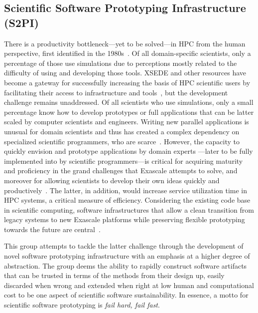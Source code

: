 \subsection{Scientific Software Prototyping Infrastructure (S2PI)}
\label{sec:prototyping}

There is a productivity bottleneck---yet to be solved---in HPC from the human
perspective, first identified in the 1980s~\cite{barstow1982automatic}. Of all
domain-specific scientists, only a percentage of those use simulations due to
perceptions mostly related to the difficulty of using and developing those tools.
XSEDE and other resources have become a gateway for successfully increasing the
basis of HPC scientific users by facilitating their access to infrastructure and
tools~\cite{towns2014xsede}, but the development challenge remains unaddressed.
Of all scientists who use simulations, only a small percentage know how
to develop prototypes or full applications that can be latter scaled by computer
scientists and engineers. Writing new parallel applications is unusual for
domain scientists and thus has created a complex dependency on specialized
scientific programmers, who are scarce~\cite{post2005computational}. However,
 the capacity to quickly envision and prototype applications by domain experts
 ---later to be fully implemented into by scientific programmers---is critical for
 acquiring maturity and proficiency in the grand challenges that Exascale
 attempts to solve, and moreover for allowing scientists to develop their own
 ideas quickly and productively~\cite{vinter2015prototyping}. The latter, in
 addition, would increase service utilization time in HPC systems, a critical
measure of efficiency. Considering the existing code base in scientific
computing, software infrastructures that allow a clean transition from legacy
systems to new Exascale platforms while preserving flexible prototyping
 towards the future are central~\cite{hwu2015transitioning}.

This group attempts to tackle the latter challenge through the development of
novel software prototyping infrastructure with an emphasis at a higher degree
of abstraction. The group deems the ability to rapidly construct software artifacts that can be
trusted in terms of the methods from their design up, easily discarded when
wrong and extended when right at low human and computational cost to be one
aspect of scientific software sustainability. In essence,
a motto for scientific software prototyping is {\it fail hard, fail fast}.

